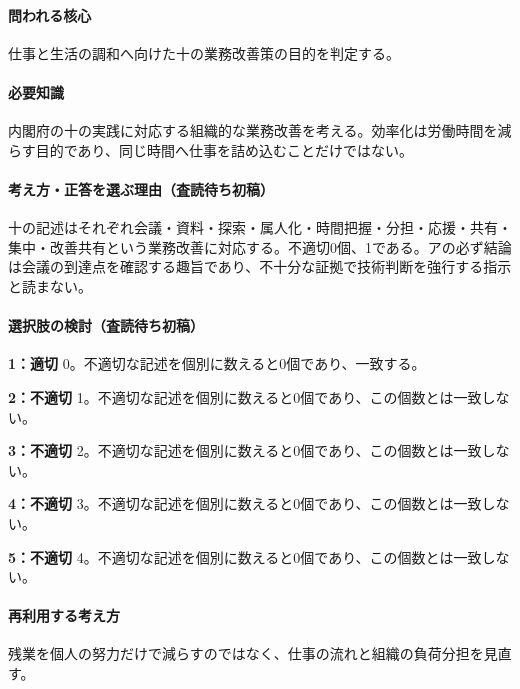 \paragraph{問われる核心} 仕事と生活の調和へ向けた十の業務改善策の目的を判定する。

\paragraph{必要知識} 内閣府の十の実践に対応する組織的な業務改善を考える。効率化は労働時間を減らす目的であり、同じ時間へ仕事を詰め込むことだけではない。

\paragraph{考え方・正答を選ぶ理由（査読待ち初稿）} 十の記述はそれぞれ会議・資料・探索・属人化・時間把握・分担・応援・共有・集中・改善共有という業務改善に対応する。不適切0個、1である。アの必ず結論は会議の到達点を確認する趣旨であり、不十分な証拠で技術判断を強行する指示と読まない。

\paragraph{選択肢の検討（査読待ち初稿）}\mbox{}\par

\noindent\textbf{1：適切} 0。不適切な記述を個別に数えると0個であり、一致する。\par

\noindent\textbf{2：不適切} 1。不適切な記述を個別に数えると0個であり、この個数とは一致しない。\par

\noindent\textbf{3：不適切} 2。不適切な記述を個別に数えると0個であり、この個数とは一致しない。\par

\noindent\textbf{4：不適切} 3。不適切な記述を個別に数えると0個であり、この個数とは一致しない。\par

\noindent\textbf{5：不適切} 4。不適切な記述を個別に数えると0個であり、この個数とは一致しない。\par

\paragraph{再利用する考え方} 残業を個人の努力だけで減らすのではなく、仕事の流れと組織の負荷分担を見直す。

